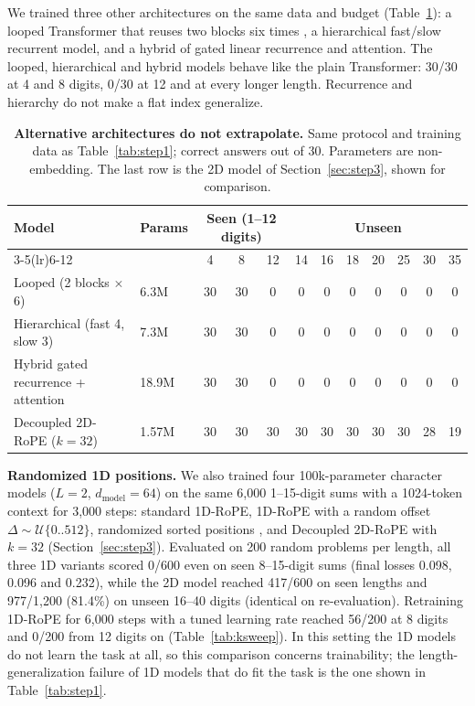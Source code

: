 \documentclass[10pt,twocolumn]{article}
\begin{document}
We trained three other architectures on the same data and budget (Table~\ref{tab:step2}): a looped Transformer that reuses two blocks six times \cite{dehghani2019universal,giannou2023looped}, a hierarchical fast/slow recurrent model, and a hybrid of gated linear recurrence and attention. The looped, hierarchical and hybrid models behave like the plain Transformer: 30/30 at 4 and 8 digits, 0/30 at 12 and at every longer length. Recurrence and hierarchy do not make a flat index generalize.

\begin{table}[!t]
\centering
\footnotesize
\setlength{\tabcolsep}{4pt}
\renewcommand{\arraystretch}{1.12}
\caption{\textbf{Alternative architectures do not extrapolate.} Same protocol and training data as Table~\ref{tab:step1}; correct answers out of 30. Parameters are non-embedding. The last row is the 2D model of Section~\ref{sec:step3}, shown for comparison.}\label{tab:step2}
\begin{tabular}{@{}llcccccccccc@{}}
\toprule
Model & Params & \multicolumn{3}{c}{Seen (1--12 digits)} & \multicolumn{7}{c}{Unseen} \\
\cmidrule(lr){3-5}\cmidrule(lr){6-12}
& & 4 & 8 & 12 & 14 & 16 & 18 & 20 & 25 & 30 & 35 \\
\midrule
Looped (2 blocks $\times$ 6) & 6.3M & 30 & 30 & 0 & 0 & 0 & 0 & 0 & 0 & 0 & 0 \\
Hierarchical (fast 4, slow 3) & 7.3M & 30 & 30 & 0 & 0 & 0 & 0 & 0 & 0 & 0 & 0 \\
Hybrid gated recurrence + attention & 18.9M & 30 & 30 & 0 & 0 & 0 & 0 & 0 & 0 & 0 & 0 \\
\midrule
Decoupled 2D-RoPE ($k=32$) & 1.57M & 30 & 30 & 30 & 30 & 30 & 30 & 30 & 30 & 28 & 19 \\
\bottomrule
\end{tabular}
\end{table}

\textbf{Randomized 1D positions.} We also trained four 100k-parameter character models ($L=2$, $d_{\text{model}}=64$) on the same 6,000 1--15-digit sums with a 1024-token context for 3,000 steps: standard 1D-RoPE, 1D-RoPE with a random offset $\Delta \sim \mathcal{U}\{0..512\}$, randomized sorted positions \cite{ruoss2023randomized}, and Decoupled 2D-RoPE with $k=32$ (Section~\ref{sec:step3}). Evaluated on 200 random problems per length, all three 1D variants scored 0/600 even on seen 8--15-digit sums (final losses 0.098, 0.096 and 0.232), while the 2D model reached 417/600 on seen lengths and 977/1,200 (81.4\%) on unseen 16--40 digits (identical on re-evaluation). Retraining 1D-RoPE for 6,000 steps with a tuned learning rate reached 56/200 at 8 digits and 0/200 from 12 digits on (Table~\ref{tab:ksweep}). In this setting the 1D models do not learn the task at all, so this comparison concerns trainability; the length-generalization failure of 1D models that do fit the task is the one shown in Table~\ref{tab:step1}.
\end{document}

